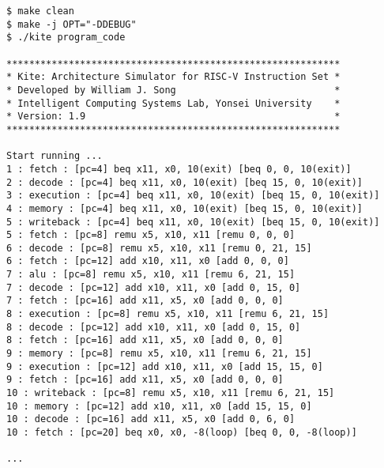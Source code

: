 \documentclass[10pt]{article}
\begin{document}
\begin{Verbatim}[frame=single]
$ make clean
$ make -j OPT="-DDEBUG" 
$ ./kite program_code

***********************************************************
* Kite: Architecture Simulator for RISC-V Instruction Set *
* Developed by William J. Song                            *
* Intelligent Computing Systems Lab, Yonsei University    *
* Version: 1.9                                            *
***********************************************************

Start running ...
1 : fetch : [pc=4] beq x11, x0, 10(exit) [beq 0, 0, 10(exit)]
2 : decode : [pc=4] beq x11, x0, 10(exit) [beq 15, 0, 10(exit)]
3 : execution : [pc=4] beq x11, x0, 10(exit) [beq 15, 0, 10(exit)]
4 : memory : [pc=4] beq x11, x0, 10(exit) [beq 15, 0, 10(exit)]
5 : writeback : [pc=4] beq x11, x0, 10(exit) [beq 15, 0, 10(exit)]
5 : fetch : [pc=8] remu x5, x10, x11 [remu 0, 0, 0]
6 : decode : [pc=8] remu x5, x10, x11 [remu 0, 21, 15]
6 : fetch : [pc=12] add x10, x11, x0 [add 0, 0, 0]
7 : alu : [pc=8] remu x5, x10, x11 [remu 6, 21, 15]
7 : decode : [pc=12] add x10, x11, x0 [add 0, 15, 0]
7 : fetch : [pc=16] add x11, x5, x0 [add 0, 0, 0]
8 : execution : [pc=8] remu x5, x10, x11 [remu 6, 21, 15]
8 : decode : [pc=12] add x10, x11, x0 [add 0, 15, 0]
8 : fetch : [pc=16] add x11, x5, x0 [add 0, 0, 0]
9 : memory : [pc=8] remu x5, x10, x11 [remu 6, 21, 15]
9 : execution : [pc=12] add x10, x11, x0 [add 15, 15, 0]
9 : fetch : [pc=16] add x11, x5, x0 [add 0, 0, 0]
10 : writeback : [pc=8] remu x5, x10, x11 [remu 6, 21, 15]
10 : memory : [pc=12] add x10, x11, x0 [add 15, 15, 0]
10 : decode : [pc=16] add x11, x5, x0 [add 0, 6, 0]
10 : fetch : [pc=20] beq x0, x0, -8(loop) [beq 0, 0, -8(loop)]

...
\end{Verbatim}
\end{document}
